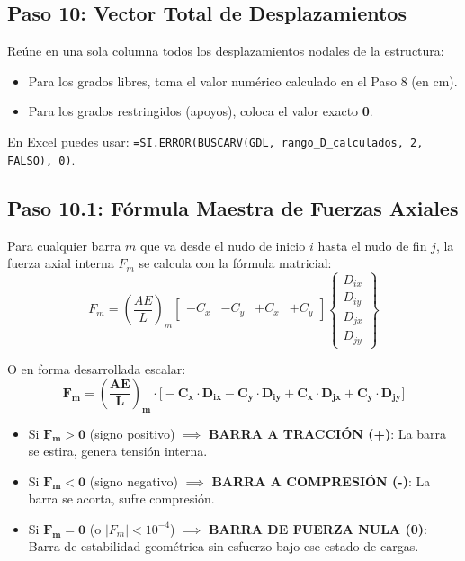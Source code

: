 \documentclass[10pt,a4paper]{article}
\begin{document}
\subsection{Paso 10: Vector Total de Desplazamientos}
Reúne en una sola columna todos los desplazamientos nodales de la estructura:
\begin{itemize}
    \item Para los grados libres, toma el valor numérico calculado en el Paso 8 (en cm).
    \item Para los grados restringidos (apoyos), coloca el valor exacto \textbf{0}.
\end{itemize}
En Excel puedes usar: \texttt{=SI.ERROR(BUSCARV(GDL, rango\_D\_calculados, 2, FALSO), 0)}.

\subsection{Paso 10.1: Fórmula Maestra de Fuerzas Axiales}
Para cualquier barra $m$ que va desde el nudo de inicio $i$ hasta el nudo de fin $j$, la fuerza axial interna $F_m$ se calcula con la fórmula matricial:
\[
F_m = \left(\frac{AE}{L}\right)_m 
\begin{bmatrix} -C_x & -C_y & +C_x & +C_y \end{bmatrix}
\begin{Bmatrix} D_{ix} \\ D_{iy} \\ D_{jx} \\ D_{jy} \end{Bmatrix}
\]

O en forma desarrollada escalar:
\[
\mathbf{F_m = \left(\frac{AE}{L}\right)_m \cdot \Big[ -C_x \cdot D_{ix} - C_y \cdot D_{iy} + C_x \cdot D_{jx} + C_y \cdot D_{jy} \Big]}
\]

\begin{notebookbox}
\begin{itemize}
    \item Si $\mathbf{F_m > 0}$ (signo positivo) $\implies$ \textbf{BARRA A TRACCIÓN (+)}: La barra se estira, genera tensión interna.
    \item Si $\mathbf{F_m < 0}$ (signo negativo) $\implies$ \textbf{BARRA A COMPRESIÓN (-)}: La barra se acorta, sufre compresión.
    \item Si $\mathbf{F_m = 0}$ (o $|F_m| < 10^{-4}$) $\implies$ \textbf{BARRA DE FUERZA NULA (0)}: Barra de estabilidad geométrica sin esfuerzo bajo ese estado de cargas.
\end{itemize}
\end{notebookbox}
\end{document}
